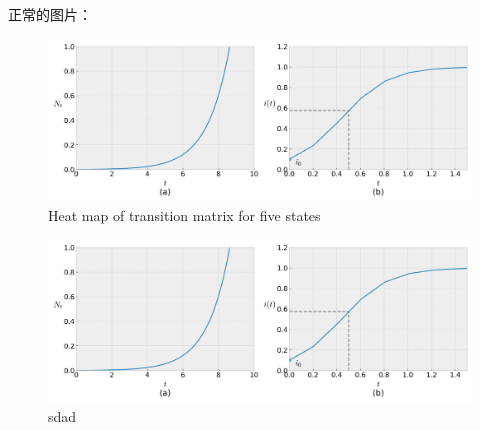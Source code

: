 \documentclass{ctexart}
\begin{document}
正常的图片：

\begin {figure}[h]
	\centering %
	\includegraphics[width=\textwidth]{1.png}
	\caption{Heat map of transition matrix for five states} %
	\label{five}
\end {figure}

\begin {figure}[h]
\centering %
\includegraphics[width=\textwidth]{1.png}
\caption{sdad} %
\label{five}
\end {figure}
\end{document}
